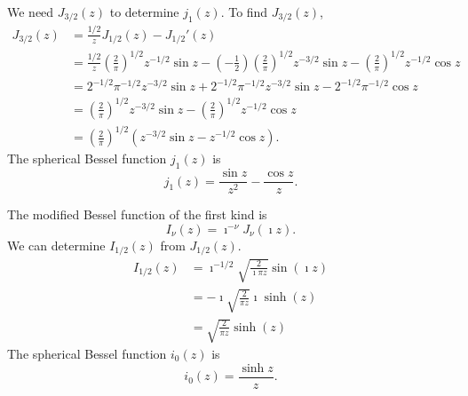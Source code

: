 {\begin{Solution}
  We need $J_{3/2}(z)$ to determine $j_1(z)$. To find $J_{3/2}(z)$,
  \begin{align*}
    J_{3/2}(z)
    &= \frac{1/2}{z} J_{1/2}(z) - J_{1/2}'(z) 
    \\
    &= \frac{1/2}{z} \left( \frac{2}{\pi} \right)^{1/2} z^{-1/2} \sin z
    - \left(-\frac{1}{2}\right) \left(\frac{2}{\pi}\right)^{1/2}
    z^{-3/2} \sin z - \left(\frac{2}{\pi}\right)^{1/2} z^{-1/2} \cos z 
    \\
    &= 2^{-1/2} \pi^{-1/2} z^{-3/2} \sin z
    + 2^{-1/2} \pi^{-1/2} z^{-3/2} \sin z
    - 2^{-1/2} \pi^{-1/2} \cos z 
    \\
    &= \left(\frac{2}{\pi}\right)^{1/2} z^{-3/2} \sin z
    - \left(\frac{2}{\pi}\right)^{1/2} z^{-1/2} \cos z 
    \\
    &= \left(\frac{2}{\pi}\right)^{1/2} \left( z^{-3/2} \sin z
      - z^{-1/2} \cos z \right).
  \end{align*}
  The spherical Bessel function $j_1(z)$ is
  \[
  \boxed{
    j_1(z) = \frac{\sin z}{z^2} - \frac{\cos z}{z}.
    }
  \]



  The modified Bessel function of the first kind is
  \[
  I_\nu(z) = \imath^{-\nu} J_\nu(\imath z).
  \]
  We can determine $I_{1/2}(z)$ from $J_{1/2}(z)$.
  \begin{align*}
    I_{1/2}(z)
    &= \imath^{-1/2} \sqrt{ \frac{2}{\imath \pi z} } \sin(\imath z) 
    \\
    &= - \imath \sqrt{ \frac{2}{\pi z} } \imath \sinh(z) 
    \\
    &= \sqrt{ \frac{2}{\pi z} } \sinh(z) 
  \end{align*}
  The spherical Bessel function $i_0(z)$ is
  \[
  \boxed{
    i_0(z) = \frac{\sinh z}{z}.
    }
  \]



\end{Solution}}
